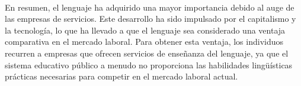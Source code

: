 \documentclass{article}
\begin{document}
    \paragraph{}
    En resumen, el lenguaje ha adquirido una mayor importancia debido al auge de las empresas de servicios. Este desarrollo ha sido impulsado por el capitalismo y la tecnología, lo que ha llevado a que el lenguaje sea considerado una ventaja comparativa en el mercado laboral. Para obtener esta ventaja, los individuos recurren a empresas que ofrecen servicios de enseñanza del lenguaje, ya que el sistema educativo público a menudo no proporciona las habilidades lingüísticas prácticas necesarias para competir en el mercado laboral actual.
\end{document}
